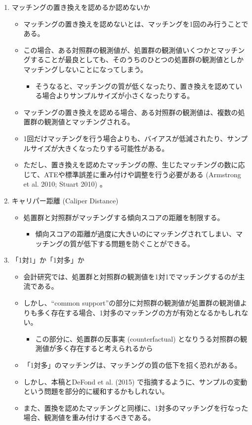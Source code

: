 \begin{enumerate}
 \item マッチングの置き換えを認めるか認めないか
       \begin{itemize}
        \item マッチングの置き換えを認めないとは、マッチングを1回のみ行うことである。
        \item この場合、ある対照群の観測値が、処置群の観測値いくつかとマッチングすることが最良としても、そのうちのひとつの処置群の観測値としかマッチングしないことになってしまう。
              \begin{itemize}
               \item そうなると、マッチングの質が低くなったり、置き換えを認めている場合よりサンプルサイズが小さくなったりする。
              \end{itemize}
        \item マッチングの置き換えを認める場合、ある対照群の観測値は、複数の処置群の観測値とマッチングされる。
        \item 1回だけマッチングを行う場合よりも、バイアスが低減されたり、サンプルサイズが大きくなったりする可能性がある。
        \item ただし、置き換えを認めたマッチングの際、生じたマッチングの数に応じて、ATEや標準誤差に重み付けや調整を行う必要がある (Armstrong et al. 2010; Stuart 2010) 。
       \end{itemize}
 \item キャリパー距離 (Caliper Distance) 
   \begin{itemize}
    \item 処置群と対照群がマッチングする傾向スコアの距離を制限する。
     \begin{itemize}
      \item 傾向スコアの距離が過度に大きいのにマッチングされてしまい、マッチングの質が低下する問題を防ぐことができる。
    \end{itemize}
   \end{itemize}
 \item 「1対1」か「1対多」か
   \begin{itemize}
    \item 会計研究では、処置群と対照群の観測値を1対1でマッチングするのが主流である。
    \item しかし、“common support”の部分に対照群の観測値が処置群の観測値よりも多く存在する場合、1対多のマッチングの方が有効となるかもしれない。
     \begin{itemize}    
      \item この部分に、処置群の反事実 (counterfactual) となりうる対照群の観測値が多く存在すると考えられるから
     \end{itemize}
    \item 「1対多」のマッチングは、マッチングの質の低下を招く恐れがある。
    \item しかし、本稿とDeFond et al. (2015) で指摘するように、サンプルの変動という問題を部分的に緩和するかもしれない。
    \item また、置換を認めたマッチングと同様に、1対多のマッチングを行なった場合、観測値を重み付けするべきである。
   \end{itemize}
\end{enumerate}

